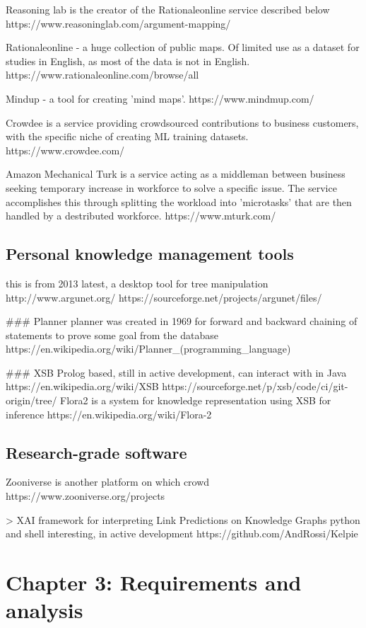\documentclass{article}
\begin{document}
Reasoning lab is the creator of the Rationaleonline service described below
https://www.reasoninglab.com/argument-mapping/

Rationaleonline - a huge collection of public maps. Of limited use as a dataset for studies in English, as most of the data is not in English.
https://www.rationaleonline.com/browse/all

Mindup - a tool for creating 'mind maps'.
https://www.mindmup.com/

Crowdee is a service providing crowdsourced contributions to business customers, with the specific niche of creating ML training datasets.
https://www.crowdee.com/

Amazon Mechanical Turk is a service acting as a middleman between business seeking temporary increase in workforce to solve a specific issue.
The service accomplishes this through splitting the workload into 'microtasks' that are then handled by a destributed workforce.
https://www.mturk.com/


\subsection{Personal knowledge management tools}
this is from 2013 latest, a desktop tool for tree manipulation
http://www.argunet.org/
https://sourceforge.net/projects/argunet/files/

### Planner
planner was created in 1969 for forward and backward chaining of statements to prove some goal from the database
https://en.wikipedia.org/wiki/Planner_(programming_language)

### XSB 
Prolog based, still in active development, can interact with in Java
https://en.wikipedia.org/wiki/XSB
https://sourceforge.net/p/xsb/code/ci/git-origin/tree/
Flora2 is a system for knowledge representation using XSB for inference
https://en.wikipedia.org/wiki/Flora-2


\subsection{Research-grade software}

Zooniverse is another platform on which crowd
https://www.zooniverse.org/projects

> XAI framework for interpreting Link Predictions on Knowledge Graphs
python and shell
interesting, in active development
https://github.com/AndRossi/Kelpie


\section{Chapter 3: Requirements and analysis}
\end{document}
